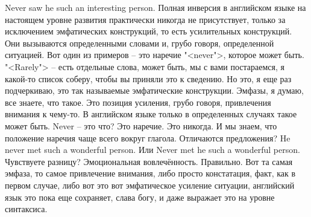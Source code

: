 \documentclass[main.tex]{subfiles}
\begin{document}
Never saw he such an interesting person.
Полная инверсия в английском языке на настоящем уровне развития практически никогда не присутствует, только за исключением эмфатических конструкций, то есть усилительных конструкций.
Они вызываются определенными словами и, грубо говоря, определенной ситуацией.
Вот один из примеров -- это наречие "<never">, которое может быть.
"<Rarely"> -- есть отдельные слова, может быть, мы с вами постараемся, я какой-то список соберу, чтобы вы приняли это к сведению.
Но это, я еще раз подчеркиваю, это так называемые эмфатические конструкции.
Эмфазы, я думаю, все знаете, что такое.
Это позиция усиления, грубо говоря, привлечения внимания к чему-то.
В английском языке только в определенных случаях такое может быть.
Never -- это что?
Это наречие.
Это никогда.
И мы знаем, что положение наречия чаще всего вокруг глагола.
Отличаются предложения?
He never met such a wonderful person.
Или Never met he such a wonderful person.
Чувствуете разницу? Эмоциональная вовлечённость.
Правильно.
Вот та самая эмфаза, то самое привлечение внимания, либо просто констатация, факт, как в первом случае, либо вот это вот эмфатическое усиление ситуации, английский язык это пока еще сохраняет, слава богу, и даже выражает это на уровне синтаксиса.
\end{document}
